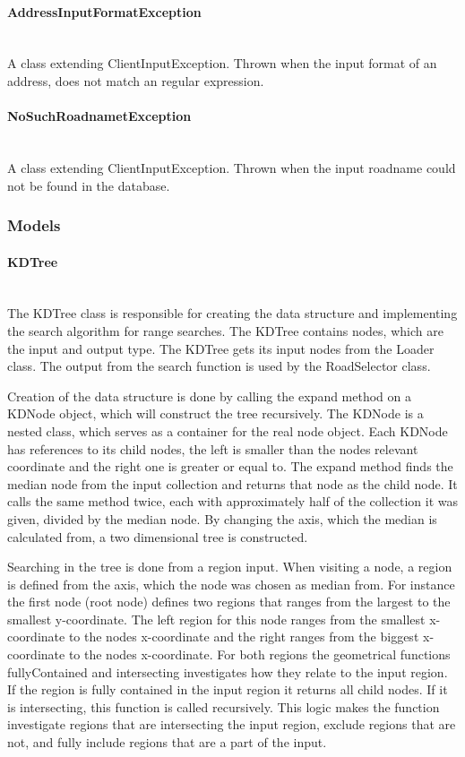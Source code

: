 \documentclass[a4paper,10pt,titlepage]{article}
\begin{document}
				\paragraph{AddressInputFormatException}\mbox{}\\
A class extending ClientInputException. Thrown when the input format of an address, does not match an regular expression.

				\paragraph{NoSuchRoadnametException}\mbox{}\\
A class extending ClientInputException. Thrown when the input roadname could not be found in the database.
				
			\subsubsection{Models}
			
				\paragraph{KDTree}\mbox{}\\
				The KDTree class is responsible for creating the data structure and implementing the search algorithm for range searches. The KDTree contains nodes, which are the input and output type. The KDTree gets its input nodes from the Loader class. The output from the search function is used by the RoadSelector class.

Creation of the data structure is done by calling the expand method on a KDNode object, which will construct the tree recursively. The KDNode is a nested class, which serves as a container for the real node object. Each KDNode has references to its child nodes, the left is smaller than the nodes relevant coordinate and the right one is greater or equal to. The expand method finds the median node from the input collection and returns that node as the child node. It calls the same method twice, each with approximately half of the collection it was given, divided by the median node. By changing the axis, which the median is calculated from, a two dimensional tree is constructed.

Searching in the tree is done from a region input. When visiting a node, a region is defined from the axis, which the node was chosen as median from. For instance the first node (root node) defines two regions that ranges from the largest to the smallest y-coordinate. The left region for this node ranges from the smallest x-coordinate to the nodes x-coordinate and the right ranges from the biggest x-coordinate to the nodes x-coordinate. For both regions the geometrical functions fullyContained and intersecting investigates how they relate to the input region. If the region is fully contained in the input region it returns all child nodes. If it is intersecting, this function is called recursively. This logic makes the function investigate regions that are intersecting the input region, exclude regions that are not, and fully include regions that are a part of the input.
\end{document}
